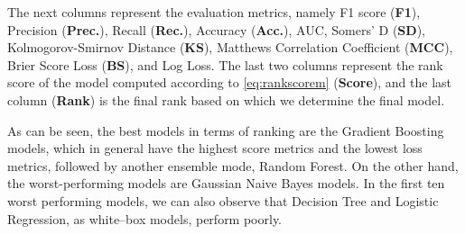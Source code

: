 The next columns represent the evaluation metrics, namely F1 score (\textbf{F1}), Precision (\textbf{Prec.}), Recall (\textbf{Rec.}), Accuracy (\textbf{Acc.}), AUC, Somers' D (\textbf{SD}), Kolmogorov-Smirnov Distance (\textbf{KS}), Matthews Correlation Coefficient (\textbf{MCC}), Brier Score Loss (\textbf{BS}), and Log Loss.
The last two columns represent the rank score of the model computed according to \autoref{eq:rankscorem} (\textbf{Score}), and the last column (\textbf{Rank}) is the final rank based on which we determine the final model.


As can be seen, the best models in terms of ranking are the Gradient Boosting models, which in general have the highest score metrics and the lowest loss metrics, followed by another ensemble mode, Random Forest.
On the other hand, the worst-performing models are Gaussian Naive Bayes models. In the first ten worst performing models, we can also observe that Decision Tree and Logistic Regression, as white--box models, perform poorly.

\clearpage
\newpage

\fancyheadoffset{0pt}



